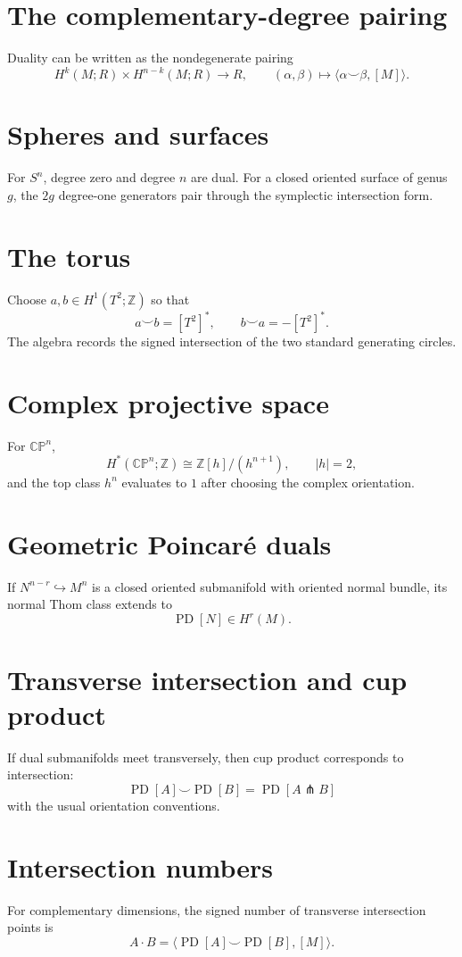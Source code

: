 \section{The complementary-degree pairing}
Duality can be written as the nondegenerate pairing
\[
H^k(M;R)\times H^{n-k}(M;R)\longrightarrow R,
\qquad
(\alpha,\beta)\longmapsto
\langle\alpha\smile\beta,[M]\rangle.
\]

\section{Spheres and surfaces}
For $S^n$, degree zero and degree $n$ are dual.  For a closed oriented surface
of genus $g$, the $2g$ degree-one generators pair through the symplectic
intersection form.

\section{The torus}
Choose $a,b\in H^1(T^2;\mathbb Z)$ so that
\[
a\smile b=[T^2]^*,\qquad b\smile a=-[T^2]^*.
\]
The algebra records the signed intersection of the two standard generating
circles.

\section{Complex projective space}
For $\mathbb{CP}^n$,
\[
H^*(\mathbb{CP}^n;\mathbb Z)\cong\mathbb Z[h]/(h^{n+1}),
\qquad |h|=2,
\]
and the top class $h^n$ evaluates to $1$ after choosing the complex
orientation.

\section{Geometric Poincaré duals}
If $N^{n-r}\hookrightarrow M^n$ is a closed oriented submanifold with oriented
normal bundle, its normal Thom class extends to
\[
\operatorname{PD}[N]\in H^r(M).
\]

\section{Transverse intersection and cup product}
If dual submanifolds meet transversely, then cup product corresponds to
intersection:
\[
\operatorname{PD}[A]\smile\operatorname{PD}[B]
=
\operatorname{PD}[A\pitchfork B]
\]
with the usual orientation conventions.

\section{Intersection numbers}
For complementary dimensions, the signed number of transverse intersection
points is
\[
A\cdot B
=
\langle \operatorname{PD}[A]\smile\operatorname{PD}[B],[M]\rangle.
\]


